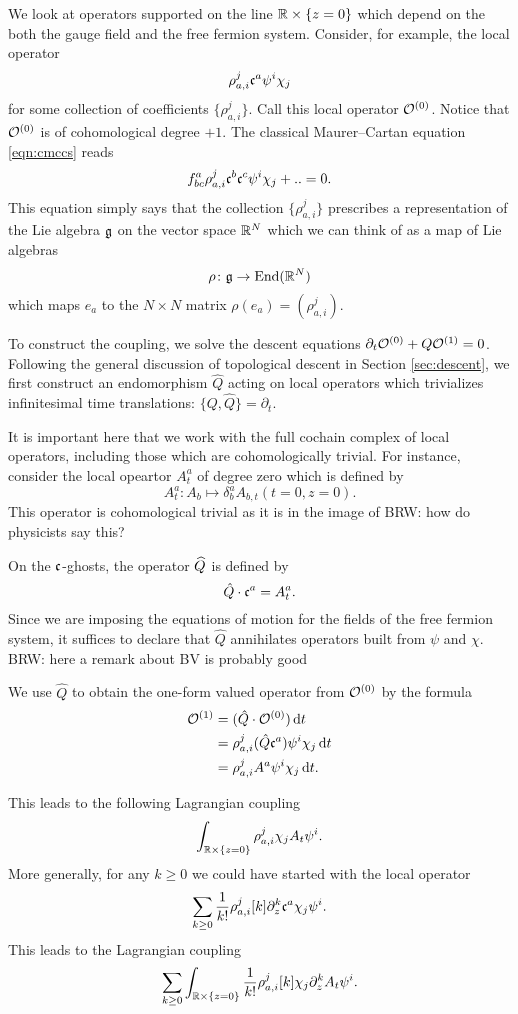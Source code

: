 \documentclass[11pt]{amsart}
\def\brian#1{{\textcolor{blue!65!red}{BRW: {#1}}}}
\begin{document}
We look at operators supported on the line $\RR \times \{z=0\}$ which depend on the both the gauge field and the free fermion system.
Consider, for example, the local operator
\[
\rho_{a,i}^{j} \fc^a \psi^i \chi_j 
\]
for some collection of coefficients $\{\rho_{a,i}^{j}\}$. 
Call this local operator $\cO^{(0)}$. 
Notice that $\cO^{(0)}$ is of cohomological degree $+1$.
The classical Maurer--Cartan equation \eqref{eqn:cmccs} reads
\[
f_{bc}^a \rho_{a,i}^{j}  \fc^b \fc^c \psi^i \chi_j + .. = 0. 
\]
This equation simply says that the collection $\{\rho_{a,i}^{j} \}$ prescribes a representation of the Lie algebra $\fg$ on the vector space $\RR^N$ which we can think of as a map of Lie algebras 
\[
\rho \colon \fg \to \End(\RR^N)
\]
which maps $e_a$ to the $N \times N$ matrix $\rho(e_a) = (\rho_{a,i}^{j})$. 

To construct the coupling, we solve the descent equations $\partial_t \cO^{(0)} + Q \cO^{(1)} = 0$.
Following the general discussion of topological descent in Section \ref{sec:descent}, we first construct an endomorphism $\hat{Q}$ acting on local operators which trivializes infinitesimal time translations: $\{Q, \hat{Q}\} = \partial_t$. 

It is important here that we work with the full cochain complex of local operators, including those which are cohomologically trivial. 
For instance, consider the local opeartor $A^a_t$ of degree zero which is defined by
\[
A^a_{t} \colon A_b \mapsto \delta^a_b A_{b,t} (t=0, z=0) .
\]
This operator is cohomological trivial as it is in the image of \brian{how do physicists say this?}

On the $\fc$-ghosts, the operator $\Hat{Q}$ is defined by 
\[
\hat{Q} \cdot \fc^a = A^a_t  .
\]
Since we are imposing the equations of motion for the fields of the free fermion system, it suffices to declare that $\hat{Q}$ annihilates operators built from $\psi$ and $\chi$. 
\brian{here a remark about BV is probably good}

We use $\hat{Q}$ to obtain the one-form valued operator from $\cO^{(0)}$ by the formula
\begin{align*}
\cO^{(1)} & = (\hat{Q} \cdot \cO^{(0)}) \, \d t \\
& = \rho_{a,i}^j (\hat{Q} \fc^a) \psi^i \chi_j \, \d t \\ 
& = \rho_{a,i}^j A^a \psi^i \chi_j \, \d t .
\end{align*}

This leads to the following Lagrangian coupling
\[
\int_{\RR \times \{z=0\}} \rho_{a,i}^j \chi_j  A_t \psi^i  .
\]
More generally, for any $k \geq 0$ we could have started with the local operator 
\[
\sum_{k \geq 0} \frac1{k!} \rho_{a,i}^j [k] \partial_z^k \fc^a \chi_j \psi^i .
\]
This leads to the Lagrangian coupling
\[
\sum_{k \geq 0} \int_{\RR \times \{z=0\}} \frac{1}{k!} \rho_{a,i}^j[k] \chi_j \partial_z^k A_t \psi^i .
\]
\end{document}
